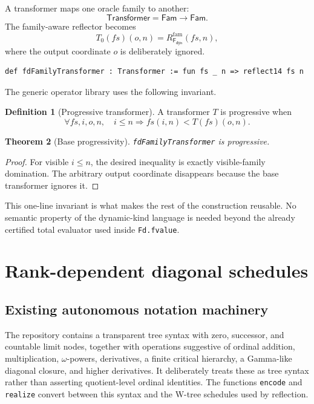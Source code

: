 \documentclass[11pt]{article}
\newtheorem{theorem}{Theorem}[section]
\theoremstyle{definition}
\newtheorem{definition}[theorem]{Definition}
\theoremstyle{remark}
\newcommand{\lean}[1]{\texttt{#1}}
\newcommand{\Fam}{\mathsf{Fam}}
\newcommand{\Trans}{\mathsf{Transformer}}
\newcommand{\Fd}{\mathsf{F}_{\mathsf{dyn}}}
\newcommand{\Rfam}{R_{\Fd}^{\mathrm{fam}}}
\begin{document}
A transformer maps one oracle family to another:
\[
\Trans=\Fam\to\Fam.
\]
The family-aware reflector becomes
\[
T_0(fs)(o,n)=\Rfam(fs,n),
\]
where the output coordinate $o$ is deliberately ignored.

\begin{lstlisting}
def fdFamilyTransformer : Transformer := fun fs _ n => reflect14 fs n
\end{lstlisting}

The generic operator library uses the following invariant.

\begin{definition}[Progressive transformer]
A transformer $T$ is progressive when
\[
\forall fs,i,o,n,
\quad i\le n\Longrightarrow fs(i,n)<T(fs)(o,n).
\]
\end{definition}

\begin{theorem}[Base progressivity]
\lean{fdFamilyTransformer} is progressive.
\end{theorem}

\begin{proof}
For visible $i\le n$, the desired inequality is exactly visible-family
domination.  The arbitrary output coordinate disappears because the base
transformer ignores it.
\end{proof}

This one-line invariant is what makes the rest of the construction reusable.
No semantic property of the dynamic-kind language is needed beyond the already
certified total evaluator used inside \lean{Fd.fvalue}.

\section{Rank-dependent diagonal schedules}

\subsection{Existing autonomous notation machinery}

The repository contains a transparent tree syntax with zero, successor, and
countable limit nodes, together with operations suggestive of ordinal addition,
multiplication, $\omega$-powers, derivatives, a finite critical hierarchy, a
Gamma-like diagonal closure, and higher derivatives.  It deliberately treats
these as tree syntax rather than asserting quotient-level ordinal identities.
The functions \lean{encode} and \lean{realize} convert between this syntax and
the W-tree schedules used by reflection.
\end{document}
